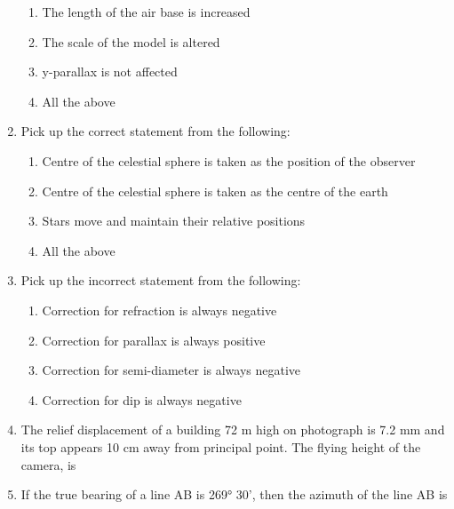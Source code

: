 \documentclass[11pt,a4paper]{article}
\begin{document}
\begin{enumerate}
\begin{enumerate}[label=\Alph*.]
\item{The length of the air base is increased}
\item{The scale of the model is altered}
\item{y-parallax is not affected}
\item{All the above}
\end{enumerate}
\item{Pick up the correct statement from the following:}
\begin{enumerate}[label=\Alph*.]
\item{Centre of the celestial sphere is taken as the position of the observer}
\item{Centre of the celestial sphere is taken as the centre of the earth}
\item{Stars move and maintain their relative positions}
\item{All the above}
\end{enumerate}
\item{Pick up the incorrect statement from the following:}
\begin{enumerate}[label=\Alph*.]
\item{Correction for refraction is always negative}
\item{Correction for parallax is always positive}
\item{Correction for semi-diameter is always negative}
\item{Correction for dip is always negative}
\end{enumerate}
\item{The relief displacement of a building 72 m high on photograph is 7.2 mm and its top appears 10 cm away from principal point. The flying height of the camera, is}
\\
\item{If the true bearing of a line AB is 269° 30', then the azimuth of the line AB is
}
\\
\end{enumerate}
\end{document}
